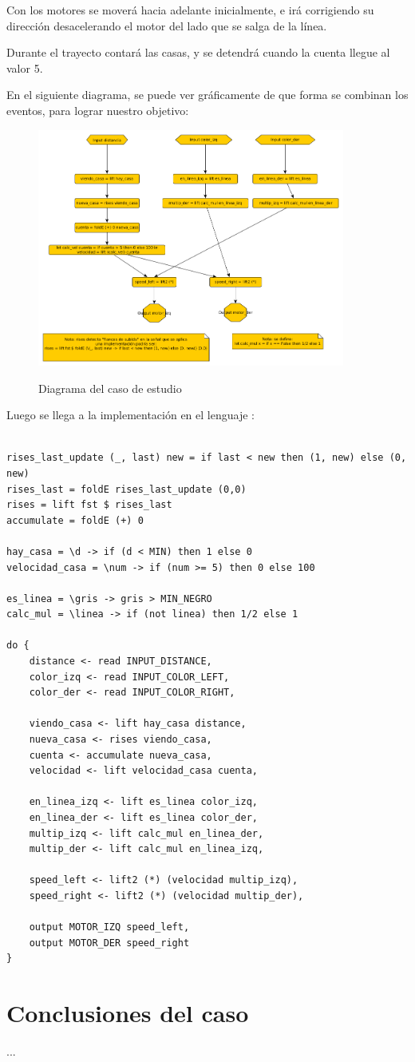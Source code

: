   Con los motores se moverá hacia adelante inicialmente, e irá corrigiendo
  su dirección desacelerando el motor del lado que se salga de la línea.

  Durante el trayecto contará las casas, y se detendrá cuando la cuenta
llegue al valor 5.

  En el siguiente diagrama, se puede ver gráficamente de que forma
se combinan los eventos, para lograr nuestro objetivo:

\begin{figure}[hbtp]
\begin{center}
\caption{Diagrama del caso de estudio}
\includegraphics[width=0.9\textwidth]{graphs/delivery.png}
\label{fig:delivery}
\end{center}
\end{figure}

  Luego se llega a la implementación en el lenguaje \frob :

\begin{verbatim}

rises_last_update (_, last) new = if last < new then (1, new) else (0, new)
rises_last = foldE rises_last_update (0,0)
rises = lift fst $ rises_last
accumulate = foldE (+) 0

hay_casa = \d -> if (d < MIN) then 1 else 0
velocidad_casa = \num -> if (num >= 5) then 0 else 100

es_linea = \gris -> gris > MIN_NEGRO
calc_mul = \linea -> if (not linea) then 1/2 else 1

do {
    distance <- read INPUT_DISTANCE,
    color_izq <- read INPUT_COLOR_LEFT,
    color_der <- read INPUT_COLOR_RIGHT,

    viendo_casa <- lift hay_casa distance,
    nueva_casa <- rises viendo_casa,
    cuenta <- accumulate nueva_casa,
    velocidad <- lift velocidad_casa cuenta,

    en_linea_izq <- lift es_linea color_izq,
    en_linea_der <- lift es_linea color_der,
    multip_izq <- lift calc_mul en_linea_der,
    multip_der <- lift calc_mul en_linea_izq,

    speed_left <- lift2 (*) (velocidad multip_izq),
    speed_right <- lift2 (*) (velocidad multip_der),

    output MOTOR_IZQ speed_left,
    output MOTOR_DER speed_right
}

\end{verbatim}

\section {Conclusiones del caso}

 ...
